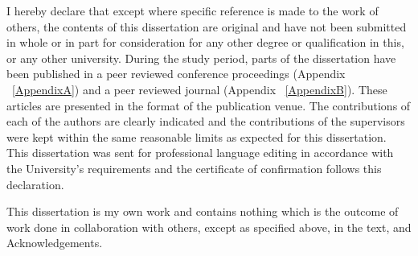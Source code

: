 
\begin{declaration}

I hereby declare that except where specific reference is made to the work of 
others, the contents of this dissertation are original and have not been 
submitted in whole or in part for consideration for any other degree or 
qualification in this, or any other university.  During the study period, parts of the dissertation have been published in a peer reviewed conference proceedings (Appendix ~\ref{AppendixA}) and a peer reviewed journal (Appendix ~\ref{AppendixB}). These articles are presented in the format of the publication venue. The contributions of each of the authors are clearly indicated and the contributions of the supervisors were kept within the same reasonable limits as expected for this dissertation. This dissertation was sent for professional language editing in accordance with the University's requirements and the certificate of confirmation follows this declaration.

This dissertation is my own work and contains nothing which is the outcome of work done in collaboration 
with others, except as specified above, in the text, and Acknowledgements.


\end{declaration}

